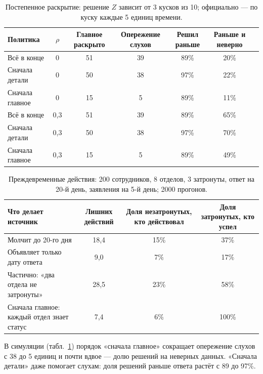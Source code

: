 \documentclass[10pt,a4paper,twocolumn]{article}
\theoremstyle{plain}
\begin{document}
\begin{table}[t]
\centering\small
\caption{Постепенное раскрытие: решение $Z$ зависит от 3 кусков из 10; официально — по куску каждые 5 единиц времени.}
\label{tab:disc}
\begin{tabular}{@{}lcccccc@{}}
\toprule
Политика & $\rho$ & Главное раскрыто & Опережение слухов & Решил раньше & Раньше и неверно \\
\midrule
Всё в конце & 0 & 51 & 39 & 89\% & 20\% \\
Сначала детали & 0 & 50 & 38 & 97\% & 22\% \\
Сначала главное & 0 & 15 & 5 & 89\% & 11\% \\
Всё в конце & 0,3 & 51 & 39 & 89\% & 65\% \\
Сначала детали & 0,3 & 50 & 38 & 97\% & 70\% \\
Сначала главное & 0,3 & 15 & 5 & 89\% & 49\% \\
\bottomrule
\end{tabular}
\end{table}

\begin{table}[t]
\centering\small
\caption{Преждевременные действия: 200 сотрудников, 8 отделов, 3 затронуты, ответ на 20-й день, заявления на 5-й день; 2000 прогонов.}
\label{tab:actions}
\begin{tabularx}{\textwidth}{@{}Xccc@{}}
\toprule
Что делает источник & Лишних действий & Доля незатронутых, кто действовал & Доля затронутых, кто успел \\
\midrule
Молчит до 20-го дня & 18,4 & 15\% & 37\% \\
Объявляет только дату ответа & 9,0 & 7\% & 17\% \\
Частично: «два отдела не затронуты» & 28,5 & 23\% & 58\% \\
Сначала главное: каждый отдел знает статус & 7,4 & 6\% & 100\% \\
\bottomrule
\end{tabularx}
\end{table}

В симуляции (табл.~\ref{tab:disc}) порядок «сначала главное» сокращает опережение слухов с 38 до 5 единиц и почти вдвое — долю решений на неверных данных. «Сначала детали» даже помогает слухам: доля решений раньше ответа растёт с 89 до 97\%.
\end{document}
